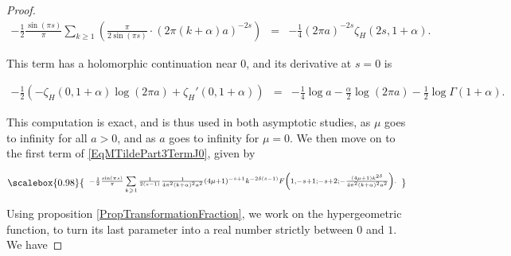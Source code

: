\documentclass{jams-l}
\theoremstyle{definition}
\theoremstyle{remark}
\numberwithin{equation}{section}
\newcommand\scalemath[2]{\scalebox{#1}{\mbox{\ensuremath{\displaystyle #2}}}}
\begin{document}
\begin{proof}
                        \[ \begin{array}{lll}
                                \scriptstyle - \frac{1}{2} \frac{\sin \left( \pi s \right)}{\pi} \sum\limits_{k \geqslant 1} \left( \frac{\pi}{2 \sin \left( \pi s \right)} \cdot \left( 2 \pi \left( k + \alpha \right) a \right)^{-2s} \right) & \scriptstyle = & \scriptstyle - \frac{1}{4} \left( 2 \pi a \right)^{-2s} \zeta_H \left( 2s, 1+\alpha \right).
                            \end{array} \]
                        
                        \noindent This term has a holomorphic continuation near $0$, and its derivative at $s=0$ is
                        
                        \[ \begin{array}{lll}
                                \scriptstyle - \frac{1}{2} \left( - \zeta_H \left( 0, 1+\alpha \right) \log \left( 2 \pi a \right) + \zeta_H' \left( 0, 1+\alpha \right) \right) & \scriptstyle = & \scriptstyle - \frac{1}{4} \log a - \frac{\alpha}{2} \log \left( 2 \pi a \right) - \frac{1}{2} \log \Gamma \left( 1 + \alpha \right).
                            \end{array} \]
                        
                        \noindent This computation is exact, and is thus used in both asymptotic studies, as $\mu$ goes to infinity for all $a > 0$, and as $a$ goes to infinity for $\mu = 0$. We then move on to the first term of \eqref{EqMTildePart3TermJ0}, given by
                        
                        \begin{equation}
                        \label{EqMTildePart3Term1J0}
                            \scalemath{0.98}{\begin{array}{c}
                                \scriptstyle - \frac{1}{2} \frac{\sin \left( \pi s \right)}{\pi} \sum\limits_{k \geqslant 1} \frac{1}{2 \left( s-1 \right)} \frac{1}{4 \pi^2 \left( k + \alpha \right)^2 a^2}\left( 4 \mu + 1 \right)^{-s+1} k^{-2 \delta \left( s-1 \right)} F \left( 1, -s+1; -s+2; - \frac{\left( 4 \mu + 1 \right) k^{2 \delta}}{4 \pi^2 \left( k + \alpha \right)^2 a^2} \right).
                            \end{array}}
                        \end{equation}
                        
                        \noindent Using proposition \ref{PropTransformationFraction}, we work on the hypergeometric function, to turn its last parameter into a real number strictly between $0$ and $1$. We have
                        

\end{proof}
\end{document}
